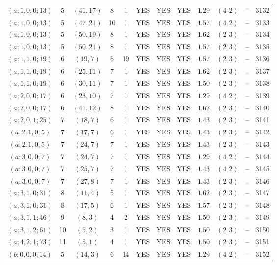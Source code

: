 \begin{longtable}{|c|c|c|c|c|c|c|c|c|c|c|c|}
$(a;1,0,0;13)$ & 5 & $(41,17)$ & 8 & 1 & YES & YES & YES & $1.29$ & $(4,2)$ & -- & 3132\\
$(a;1,0,0;13)$ & 5 & $(47,21)$ & 10 & 1 & YES & YES & YES & $1.57$ & $(4,2)$ & -- & 3133\\
$(a;1,0,0;13)$ & 5 & $(50,19)$ & 8 & 1 & YES & YES & YES & $1.62$ & $(2,3)$ & -- & 3134\\
$(a;1,0,0;13)$ & 5 & $(50,21)$ & 8 & 1 & YES & YES & YES & $1.57$ & $(2,3)$ & -- & 3135\\
$(a;1,1,0;19)$ & 6 & $(19,7)$ & 6 & 19 & YES & YES & YES & $1.57$ & $(2,3)$ & -- & 3136\\
$(a;1,1,0;19)$ & 6 & $(25,11)$ & 7 & 1 & YES & YES & YES & $1.62$ & $(2,3)$ & -- & 3137\\
$(a;1,1,0;19)$ & 6 & $(30,11)$ & 7 & 1 & YES & YES & YES & $1.50$ & $(2,3)$ & -- & 3138\\
$(a;2,0,0;17)$ & 6 & $(23,10)$ & 7 & 1 & YES & YES & YES & $1.29$ & $(4,2)$ & -- & 3139\\
$(a;2,0,0;17)$ & 6 & $(41,12)$ & 8 & 1 & YES & YES & YES & $1.62$ & $(2,3)$ & -- & 3140\\
$(a;2,0,1;25)$ & 7 & $(18,7)$ & 6 & 1 & YES & YES & YES & $1.43$ & $(2,3)$ & -- & 3141\\
$(a;2,1,0;5)$ & 7 & $(17,7)$ & 6 & 1 & YES & YES & YES & $1.43$ & $(2,3)$ & -- & 3142\\
$(a;2,1,0;5)$ & 7 & $(24,7)$ & 7 & 1 & YES & YES & YES & $1.43$ & $(2,3)$ & -- & 3143\\
$(a;3,0,0;7)$ & 7 & $(24,7)$ & 7 & 1 & YES & YES & YES & $1.29$ & $(4,2)$ & -- & 3144\\
$(a;3,0,0;7)$ & 7 & $(25,7)$ & 7 & 1 & YES & YES & YES & $1.43$ & $(4,2)$ & -- & 3145\\
$(a;3,0,0;7)$ & 7 & $(27,8)$ & 7 & 1 & YES & YES & YES & $1.43$ & $(2,3)$ & -- & 3146\\
$(a;3,1,0;31)$ & 8 & $(11,4)$ & 5 & 1 & YES & YES & YES & $1.62$ & $(2,3)$ & -- & 3147\\
$(a;3,1,0;31)$ & 8 & $(17,5)$ & 6 & 1 & YES & YES & YES & $1.57$ & $(2,3)$ & -- & 3148\\
$(a;3,1,1;46)$ & 9 & $(8,3)$ & 4 & 2 & YES & YES & YES & $1.50$ & $(2,3)$ & -- & 3149\\
$(a;3,1,2;61)$ & 10 & $(5,2)$ & 3 & 1 & YES & YES & YES & $1.50$ & $(2,3)$ & -- & 3150\\
$(a;4,2,1;73)$ & 11 & $(5,1)$ & 4 & 1 & YES & YES & YES & $1.50$ & $(2,3)$ & -- & 3151\\
$(b;0,0,0;14)$ & 5 & $(14,3)$ & 6 & 14 & YES & YES & YES & $1.29$ & $(4,2)$ & -- & 3152\\

\end{longtable}
